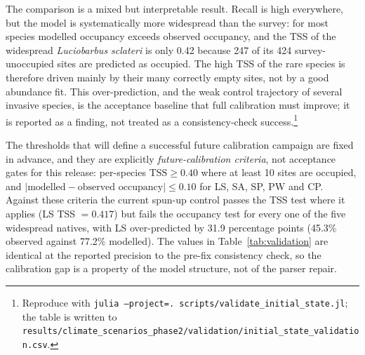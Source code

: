 \documentclass[11pt,a4paper]{article}
\begin{document}
The comparison is a mixed but interpretable result. Recall is high everywhere, but the model is
systematically more widespread than the survey: for most species modelled occupancy exceeds
observed occupancy, and the TSS of the widespread \textit{Luciobarbus sclateri} is only 0.42 because
247 of its 424 survey-unoccupied sites are predicted as occupied. The high TSS of the rare species is
therefore driven mainly by their many correctly empty sites, not by a good abundance fit. This
over-prediction, and the weak control trajectory of several invasive species, is the acceptance
baseline that full calibration must improve; it is reported as a finding, not treated as a
consistency-check success.\footnote{Reproduce with \texttt{julia --project=. scripts/validate\_initial\_state.jl};
the table is written to \texttt{results/climate\_scenarios\_phase2/validation/initial\_state\_validation.csv}.}

The thresholds that will define a successful future calibration campaign are fixed in advance, and
they are explicitly \emph{future-calibration criteria}, not acceptance gates for this release:
per-species $\mathrm{TSS}\ge0.40$ where at least 10 sites are occupied, and
$|\text{modelled}-\text{observed occupancy}|\le0.10$ for LS, SA, SP, PW and CP. Against these
criteria the current spun-up control passes the TSS test where it applies (LS TSS $=0.417$) but fails
the occupancy test for every one of the five widespread natives, with LS over-predicted by 31.9
percentage points (45.3\% observed against 77.2\% modelled). The values in Table~\ref{tab:validation}
are identical at the reported precision to the pre-fix consistency check, so the calibration gap is a
property of the model structure, not of the parser repair.
\end{document}
